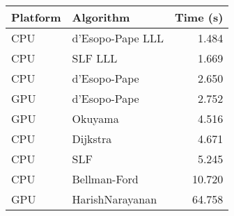 \begin{tabular}{llr}
  \hline
  Platform & Algorithm & Time (s) \\
  \hline
  CPU & d'Esopo-Pape LLL & 1.484 \\
  CPU & SLF LLL & 1.669 \\
  CPU & d'Esopo-Pape & 2.650 \\
  GPU & d'Esopo-Pape & 2.752 \\
  GPU & Okuyama & 4.516 \\
  CPU & Dijkstra & 4.671 \\
  CPU & SLF & 5.245 \\
  CPU & Bellman-Ford & 10.720 \\
  GPU & HarishNarayanan & 64.758 \\
  \hline
\end{tabular}

